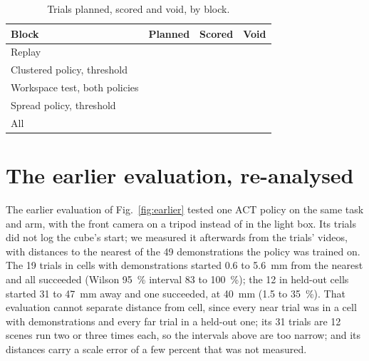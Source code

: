 \begin{table}[t]
\caption{Trials planned, scored and void, by block.}
\label{tab:counts}
\centering
\footnotesize
\begin{tabular}{@{}lccc@{}}
\toprule
Block & Planned & Scored & Void \\
\midrule
Replay & \plannedReplay{} & \nTrialsReplay{} & \nVoidReplay{} \\
Clustered policy, threshold & \plannedClustered{} & \nTrialsClusteredThreshold{} & \nVoidClusteredThreshold{} \\
Workspace test, both policies & \plannedWorkspace{} & \nTrialsWorkspace{} & \nVoidWorkspace{} \\
Spread policy, threshold & \plannedSpread{} & \nTrialsSpreadThreshold{} & \nVoidSpreadThreshold{} \\
\midrule
All & \plannedTotal{} & \nTrialsTotal{} & \nVoidTotal{} \\
\bottomrule
\end{tabular}
\end{table}

\section{The earlier evaluation, re-analysed}
\label{app:earlier}
The earlier evaluation of Fig.~\ref{fig:earlier} tested one ACT policy on the same task and arm, with the front camera on a tripod instead of in the light box. %
Its trials did not log the cube's start; we measured it afterwards from the trials' videos, with distances to the nearest of the 49 demonstrations the policy was trained on. %
The 19 trials in cells with demonstrations started 0.6 to 5.6~mm from the nearest and all succeeded (Wilson 95~\% interval 83 to 100~\%); the 12 in held-out cells started 31 to 47~mm away and one succeeded, at 40~mm (1.5 to 35~\%). %
That evaluation cannot separate distance from cell, since every near trial was in a cell with demonstrations and every far trial in a held-out one; its 31 trials are 12 scenes run two or three times each, so the intervals above are too narrow; and its distances carry a scale error of a few percent that was not measured. %

